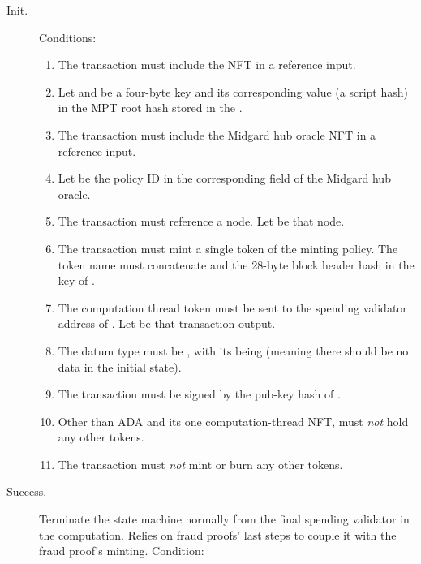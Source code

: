 \documentclass[../midgard.tex]{subfiles}
\begin{document}
\begin{description}
    \item[Init.] Conditions:
        \begin{enumerate}
            \item The transaction must include the  NFT in a reference input.
            \item Let  and  be a four-byte key and its corresponding value (a script hash) in the MPT root hash stored in the .
            \item The transaction must include the Midgard hub oracle NFT in a reference input.
            \item Let  be the policy ID in the corresponding field of the Midgard hub oracle.
            \item The transaction must reference a  node.
              Let  be that node.
            \item The transaction must mint a single token of the  minting policy.
              The token name must concatenate  and the 28-byte block header hash in the key of .
            \item The computation thread token must be sent to the spending validator address of .
              Let  be that transaction output.
            \item The  datum type must be , with its  being  (meaning there should be no data in the initial state).
            \item The transaction must be signed by the  pub-key hash of .
            \item Other than ADA and its one computation-thread NFT,  must \emph{not} hold any other tokens.
            \item The transaction must \emph{not} mint or burn any other tokens.
        \end{enumerate}
    \item[Success.] Terminate the state machine normally from the final spending validator in the computation.
      Relies on fraud proofs' last steps to couple it with the fraud proof's minting.
      Condition:
        \begin{enumerate}

\end{enumerate}
\end{description}
\end{document}
